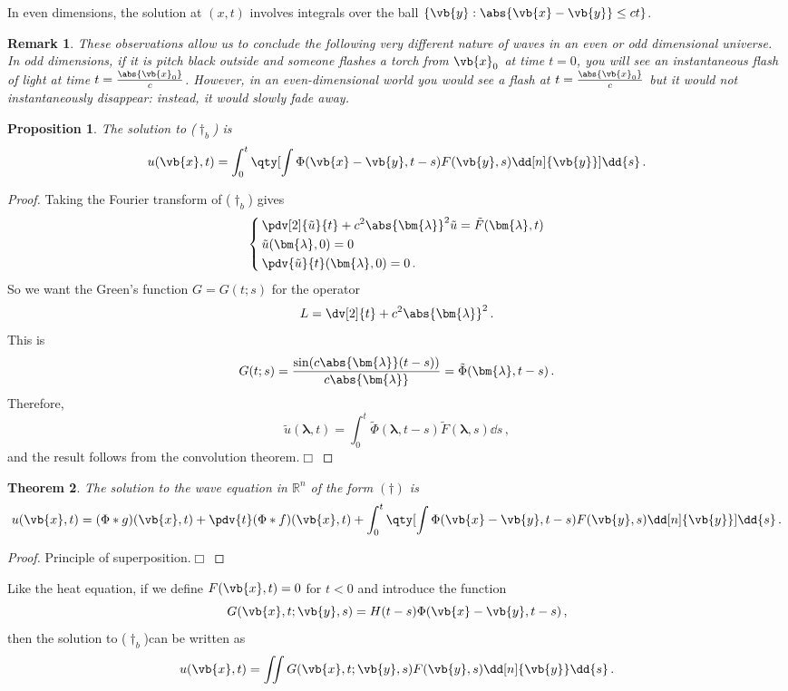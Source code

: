 \documentclass{article}
\theoremstyle{plain}\theoremheaderfont{\normalfont\itshape}\theorembodyfont{\rmfamily}\theoremseparator{.}\newtheorem*{rem}{Remark}\newtheorem*{ex}{Example}\newtheorem*{proof}{Proof}\newtheorem*{altp}{Alternative proof}
\theoremstyle{plain}\theoremheaderfont{\normalfont\bfseries}\theorembodyfont{\rmfamily}\theoremseparator{.}\newtheorem{thm}{Theorem}[section]\newtheorem{lem}[thm]{Lemma}\newtheorem{prop}[thm]{Proposition}\newtheorem*{cor}{Corollary}\newtheorem{defn}[thm]{Definition}\newtheorem{clm}[thm]{Claim}\newtheorem{clminproof}{Claim}
\theoremstyle{break}\theoremheaderfont{\normalfont\itshape}\theorembodyfont{\rmfamily}\theoremseparator{.\medskip}\newtheorem*{proofskip}{Proof}\newtheorem*{exs}{Examples}\newtheorem*{rems}{Remarks}
\theoremstyle{break}\theoremheaderfont{\normalfont\bfseries}\theorembodyfont{\rmfamily}\theoremseparator{.\medskip}\newtheorem{lemskip}[thm]{Lemma}\newtheorem{defnskip}[thm]{Definition}\newtheorem{propskip}[thm]{Proposition}\newtheorem{thmskip}[thm]{Theorem}
\numberwithin{equation}{section}
\newcommand{\qed}{\hfill\ensuremath{\Box}}
\newcommand{\bl}{\bm{\lambda}}
\begin{document}
	In even dimensions, the solution at \((x, t)\) involves integrals over the ball \(\{\vb{y}:\abs{\vb{x}-\vb{y}}\le ct\}\).

	\begin{rem}
		These observations allow us to conclude the following very different nature of waves in an even or odd dimensional universe. In odd dimensions, if it is pitch black outside and someone flashes a torch from \(\vb{x}_0\) at time \(t=0\), you will see an instantaneous flash of light at time \(t=\frac{\abs{\vb{x}_0}}{c}\). However, in an even-dimensional world you would see a flash at \(t=\frac{\abs{\vb{x}_0}}{c}\) but it would not instantaneously disappear: instead, it would slowly fade away.
	\end{rem}
	\begin{prop}
		The solution to (\(\dagger_b\)) is
		\[u(\vb{x},t)=\int_{0}^{t}\qty[\int\Phi(\vb{x}-\vb{y},t-s)F(\vb{y},s)\dd[n]{\vb{y}}]\dd{s}\,.\]
	\end{prop}
	\begin{proof}
		Taking the Fourier transform of (\(\dagger_b\)) gives
		\[\left\{\begin{aligned}
			&\,\pdv[2]{\tilde{u}}{t}+c^2\abs{\bl}^2\tilde{u}=\tilde{F}(\bl,t)\\
			&\,\tilde{u}(\bl,0)=0\\
			&\,\pdv{\tilde{u}}{t}(\bl,0)=0\,.
		\end{aligned}\right.\]
		So we want the Green's function \(G=G(t;s)\) for the operator
		\[L=\dv[2]{t}+c^2\abs{\bl}^2\,.\]
		This is
		\[G(t;s)=\frac{\sin(c\abs{\bl}(t-s))}{c\abs{\bl}}=\tilde{\Phi}(\bl,t-s)\,.\]
		Therefore,
		\[\tilde{u}(\bl,t)=\int_{0}^{t}\tilde{\Phi}(\bl,t-s)\tilde{F}(\bl,s)\dd{s}\,,\]
		and the result follows from the convolution theorem.\qed
	\end{proof}

	\begin{thm}
		The solution to the wave equation in \(\mathbb{R}^n\) of the form \((\dagger)\) is
		\[u(\vb{x},t)=(\Phi*g)(\vb{x},t)+\pdv{t}(\Phi*f)(\vb{x},t)+\int_{0}^{t}\qty[\int\Phi(\vb{x}-\vb{y},t-s)F(\vb{y},s)\dd[n]{\vb{y}}]\dd{s}\,.\]
	\end{thm}
	\begin{proof}
		Principle of superposition.\qed
	\end{proof}

	Like the heat equation, if we define \(F(\vb{x},t)=0\) for \(t<0\) and introduce the function
	\[G(\vb{x},t;\vb{y},s)=H(t-s)\Phi(\vb{x}-\vb{y},t-s)\,,\]
	then the solution to (\(\dagger_b\))can be written as
	\[u(\vb{x},t)=\iint G(\vb{x},t;\vb{y},s)F(\vb{y},s)\dd[n]{\vb{y}}\dd{s}\,.\]
\end{document}

